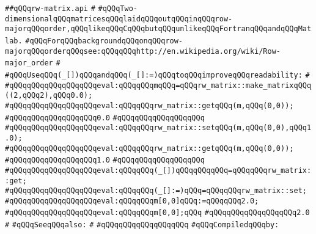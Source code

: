 \label{src/lib/std/src/rw-matrix.api}
\verb|##qQQqrw-matrix.api|\newline
\verb|#|\newline
\verb|#qQQqTwo-dimensionalqQQqmatricesqQQqlaidqQQqoutqQQqinqQQqrow-majorqQQqorder,qQQqlikeqQQqCqQQqbutqQQqunlikeqQQqFortranqQQqandqQQqMatlab.|\newline
\verb|#qQQqForqQQqbackgroundqQQqonqQQqrow-majorqQQqorderqQQqsee:qQQqqQQqhttp://en.wikipedia.org/wiki/Row-major_order|\newline
\verb|#|\newline
\verb|#qQQqUseqQQq(_[])qQQqandqQQq(_[]:=)qQQqtoqQQqimproveqQQqreadability:|\newline
\verb|#|\newline
\verb|#qQQqqQQqqQQqqQQqqQQqeval:qQQqqQQqmqQQq=qQQqrw_matrix::make_matrixqQQq((2,qQQq2),qQQq0.0);|\newline
\verb|#qQQqqQQqqQQqqQQqqQQqeval:qQQqqQQqrw_matrix::getqQQq(m,qQQq(0,0));|\newline
\verb|#qQQqqQQqqQQqqQQqqQQq0.0|\newline
\verb|#qQQqqQQqqQQqqQQqqQQq|\newline
\verb|#qQQqqQQqqQQqqQQqqQQqeval:qQQqqQQqrw_matrix::setqQQq(m,qQQq(0,0),qQQq1.0);|\newline
\verb|#qQQqqQQqqQQqqQQqqQQqeval:qQQqqQQqrw_matrix::getqQQq(m,qQQq(0,0));|\newline
\verb|#qQQqqQQqqQQqqQQqqQQq1.0|\newline
\verb|#qQQqqQQqqQQqqQQqqQQq|\newline
\verb|#qQQqqQQqqQQqqQQqqQQqeval:qQQqqQQq(_[])qQQqqQQqqQQq=qQQqqQQqrw_matrix::get;|\newline
\verb|#qQQqqQQqqQQqqQQqqQQqeval:qQQqqQQq(_[]:=)qQQq=qQQqqQQqrw_matrix::set;|\newline
\verb|#qQQqqQQqqQQqqQQqqQQqeval:qQQqqQQqm[0,0]qQQq:=qQQqqQQq2.0;|\newline
\verb|#qQQqqQQqqQQqqQQqqQQqeval:qQQqqQQqm[0,0];qQQq|\newline
\verb|#qQQqqQQqqQQqqQQqqQQq2.0|\newline
\verb|#|\newline
\verb|#qQQqSeeqQQqalso:|\newline
\verb|#|\newline
\verb|#qQQqqQQqqQQqqQQqqQQq|\newline
\newline
\verb|#qQQqCompiledqQQqby:|\newline

